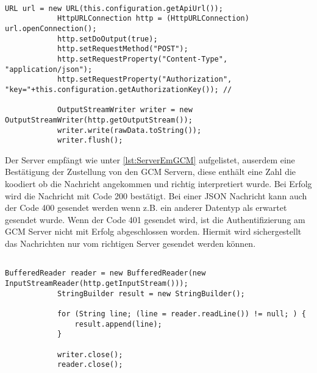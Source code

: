 \begin{lstlisting}[caption={Senden von Nachrichten vom Server},label=lst:ServerSeGCM]

URL url = new URL(this.configuration.getApiUrl());
			HttpURLConnection http = (HttpURLConnection) url.openConnection();
			http.setDoOutput(true);
			http.setRequestMethod("POST");
			http.setRequestProperty("Content-Type", "application/json");
			http.setRequestProperty("Authorization", "key="+this.configuration.getAuthorizationKey()); //
			
			OutputStreamWriter writer = new OutputStreamWriter(http.getOutputStream());
			writer.write(rawData.toString());
			writer.flush();

\end{lstlisting}

Der Server empfängt wie unter \ref{lst:ServerEmGCM} aufgelistet, auserdem eine Bestätigung der Zustellung von den GCM Servern, diese enthält eine Zahl die koodiert ob die Nachricht angekommen und richtig interpretiert wurde. Bei Erfolg wird die Nachricht mit Code 200 bestätigt. Bei einer JSON Nachricht kann auch der Code 400 gesendet werden wenn z.B. ein anderer Datentyp als erwartet gesendet wurde. Wenn der Code 401 gesendet wird, ist die Authentifizierung am GCM Server nicht mit Erfolg abgeschlossen worden. Hiermit wird sichergestellt das Nachrichten nur vom richtigen Server gesendet werden können. 


\begin{lstlisting}[caption={Empfangen von Bestätigungen am Server},label=lst:ServerEmGCM]

BufferedReader reader = new BufferedReader(new InputStreamReader(http.getInputStream()));
			StringBuilder result = new StringBuilder();
			
			for (String line; (line = reader.readLine()) != null; ) {
				result.append(line);
			}

			writer.close();
			reader.close();

\end{lstlisting}
